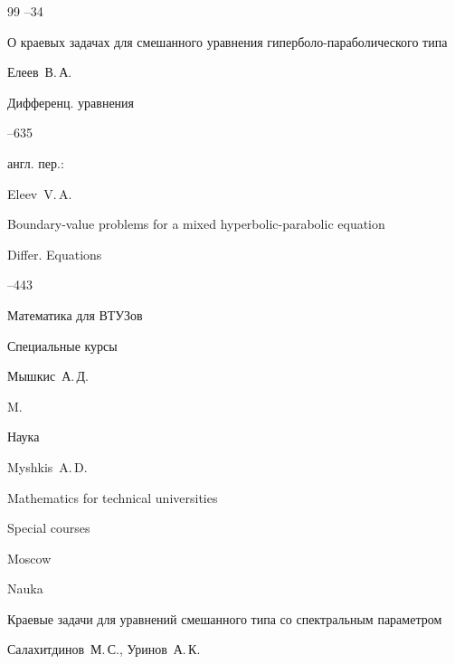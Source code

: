 \begin{thebibliography}{99}
--34






\paper О краевых задачах для смешанного уравнения гиперболо-параболического типа

\by Елеев~В.\,А.

\jour Дифференц. уравнения




--635

\transl англ. пер.:~

\by Eleev~V.\,A.

\paper Boundary-value problems for a mixed hyperbolic-parabolic equation

\jour Differ. Equations 



--443 









\book Математика для ВТУЗов

\bookinfo Специальные курсы

\by Мышкис~А.\,Д.

\publaddr M.

\publ Наука



\misctransl

\by Myshkis~A.\,D.

\book Mathematics for technical universities

\bookinfo Special courses

\publaddr Moscow

\publ  Nauka








\book Краевые задачи для уравнений смешанного типа со спектральным параметром

\by Салахитдинов~М.\,С., Уринов~А.\,К.


\end{thebibliography}
